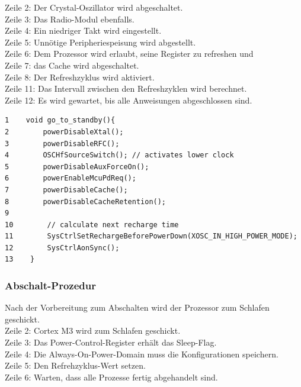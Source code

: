 Zeile 2:\hspace{1cm}   Der Crystal-Oszillator wird abgeschaltet.\\
Zeile 3:\hspace{1cm}   Das Radio-Modul ebenfalls.\\ 
Zeile 4:\hspace{1cm}   Ein niedriger Takt wird eingestellt.\\ 
Zeile 5:\hspace{1cm}   Unnötige Peripheriespeisung wird abgestellt.\\ 
Zeile 6:\hspace{1cm}   Dem Prozessor wird erlaubt, seine Register zu refreshen und\\ 
Zeile 7:\hspace{1cm}   das Cache wird abgeschaltet.\\ 
Zeile 8:\hspace{1cm}   Der Refreshzyklus wird aktiviert.\\
Zeile 11:\hspace{1cm}  Das Intervall zwischen den Refreshzyklen wird berechnet.\\
Zeile 12:\hspace{1cm}  Es wird gewartet, bis alle Anweisungen abgeschlossen sind.\\



\begin{minipage}[t]{1\textwidth}
\small\begin{verbatim}
1    void go_to_standby(){ 
2        powerDisableXtal();
3        powerDisableRFC();
4        OSCHfSourceSwitch(); // activates lower clock
5        powerDisableAuxForceOn();
6        powerEnableMcuPdReq();
7        powerDisableCache();
8        powerDisableCacheRetention();
9
10        // calculate next recharge time
11        SysCtrlSetRechargeBeforePowerDown(XOSC_IN_HIGH_POWER_MODE);
12        SysCtrlAonSync();
13    } 
    \end{verbatim}\normalsize
\end{minipage} 	    

\clearpage
\subsubsection{Abschalt-Prozedur}
\label{ausschalten}

Nach der Vorbereitung zum Abschalten wird der Prozessor zum Schlafen geschickt.\\

Zeile 2:\hspace{1cm}   Cortex M3 wird zum Schlafen geschickt.\\
Zeile 3:\hspace{1cm}   Das Power-Control-Register erhält das Sleep-Flag.\\
Zeile 4:\hspace{1cm}   Die Always-On-Power-Domain muss die Konfigurationen speichern.\\
Zeile 5:\hspace{1cm}   Den Refrehzyklus-Wert setzen.\\
Zeile 6:\hspace{1cm}   Warten, dass alle Prozesse fertig abgehandelt sind.\\

